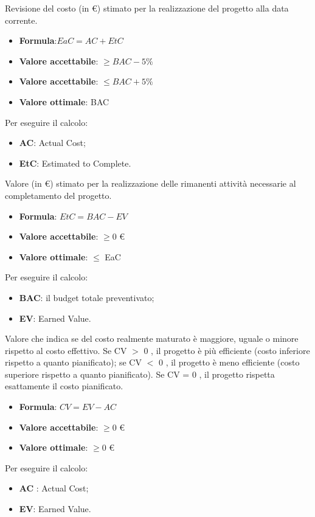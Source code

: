 Revisione del costo (in \euro) stimato per la realizzazione del progetto alla data corrente. 
\begin{itemize}
    \item \textbf{Formula}:$EaC = AC+EtC$
    \item \textbf{Valore accettabile}: $\geq BAC - 5\%$
    \item \textbf{Valore accettabile}: $\leq  BAC + 5\%$
    \item \textbf{Valore ottimale}: BAC
\end{itemize}  
Per eseguire il calcolo:
\begin{itemize}
    \item \textbf{AC}: Actual Cost;
    \item \textbf{EtC}: Estimated to Complete.
\end{itemize}


Valore (in \euro) stimato per la realizzazione delle rimanenti attività necessarie al completamento del progetto. 
\begin{itemize}
    \item \textbf{Formula}: $EtC=BAC-EV$
    \item \textbf{Valore accettabile}: $\geq0$ \euro
    \item \textbf{Valore ottimale}: $\leq$ EaC
\end{itemize}  
Per eseguire il calcolo:
\begin{itemize}
    \item \textbf{BAC}: il budget totale preventivato;
    \item \textbf{EV}: Earned Value.
\end{itemize}

Valore che indica se del costo realmente maturato è maggiore, uguale o minore rispetto al costo effettivo.
Se CV $>$ 0 , il progetto è più efficiente (costo inferiore rispetto a quanto pianificato); 
se CV $<$ 0 , il progetto è meno efficiente (costo superiore rispetto a quanto pianificato). 
Se CV = 0 , il progetto rispetta esattamente il costo pianificato.
\begin{itemize}
    \item \textbf{Formula}: $CV=EV-AC$
    \item \textbf{Valore accettabile}: $\geq0$ \euro
    \item \textbf{Valore ottimale}: $\geq0$ \euro
\end{itemize}  
Per eseguire il calcolo:
\begin{itemize}
    \item \textbf{AC} : Actual Cost;
    \item \textbf{EV}: Earned Value.
\end{itemize}

